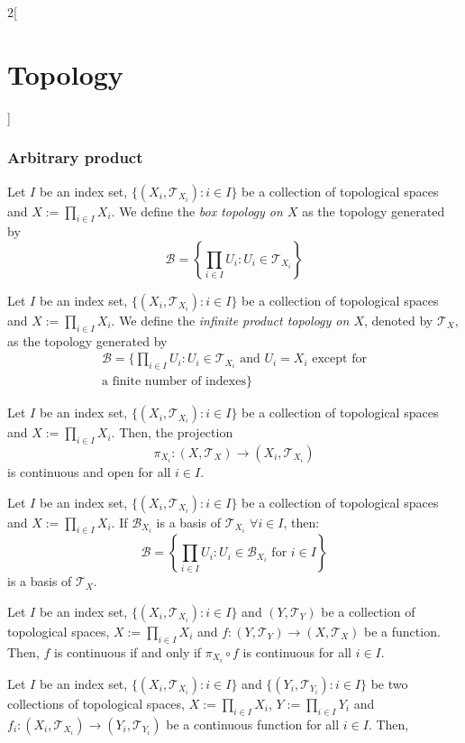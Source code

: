 \documentclass[../../../main.tex]{subfiles}
\begin{document}
\begin{multicols}{2}[\section{Topology}]
  \subsubsection{Arbitrary product}
  \begin{definition}
    Let $I$ be an index set, $\{(X_i,\mathcal{T}_{X_i}):i\in I\}$ be a collection of topological spaces and $X:=\prod_{i\in I}X_i$. We define the \textit{box topology on $X$} as the topology generated by $$\mathcal{B}=\left\{\prod_{i\in I}U_i:U_i\in\mathcal{T}_{X_i}\right\}$$
  \end{definition}
  \begin{definition}
    Let $I$ be an index set, $\{(X_i,\mathcal{T}_{X_i}):i\in I\}$ be a collection of topological spaces and $X:=\prod_{i\in I}X_i$. We define the \textit{infinite product topology on $X$}, denoted by $\mathcal{T}_X$, as the topology generated by
    \begin{multline*}
      \mathcal{B}=\Bigg\{\prod_{i\in I}U_i:U_i\in\mathcal{T}_{X_i}\text{ and $U_i=X_i$ except for}\\\text{a finite number of indexes}\Bigg\}
    \end{multline*}
  \end{definition}
  \begin{prop}
    Let $I$ be an index set, $\{(X_i,\mathcal{T}_{X_i}):i\in I\}$ be a collection of topological spaces and $X:=\prod_{i\in I}X_i$. Then, the projection $$\pi_{X_i}:\left(X,\mathcal{T}_X\right)\longrightarrow (X_i,\mathcal{T}_{X_i})$$
    is continuous and open for all $i\in I$.
  \end{prop}
  \begin{prop}
    Let $I$ be an index set, $\{(X_i,\mathcal{T}_{X_i}):i\in I\}$ be a collection of topological spaces and $X:=\prod_{i\in I}X_i$. If $\mathcal{B}_{X_i}$ is a basis of $\mathcal{T}_{X_i}$ $\forall i\in I$, then: $$\mathcal{B}=\left\{\prod_{i\in I}U_i:U_i\in\mathcal{B}_{X_i}\text{ for }i\in I\right\}$$
    is a basis of $\mathcal{T}_X$.
  \end{prop}
  \begin{prop}
    Let $I$ be an index set, $\{(X_i,\mathcal{T}_{X_i}):i\in I\}$ and $(Y,\mathcal{T}_Y)$ be a collection of topological spaces, $X:=\prod_{i\in I}X_i$ and $f:(Y,\mathcal{T}_Y)\rightarrow(X,\mathcal{T}_X)$ be a function. Then, $f$ is continuous if and only if $\pi_{X_i}\circ f$ is continuous for all $i\in I$.
  \end{prop}
  \begin{prop}
    Let $I$ be an index set, $\{(X_i,\mathcal{T}_{X_i}):i\in I\}$ and $\{(Y_i,\mathcal{T}_{Y_i}):i\in I\}$ be two collections of topological spaces, $X:=\prod_{i\in I}X_i$, $Y:=\prod_{i\in I}Y_i$ and $f_i:(X_i,\mathcal{T}_{X_i})\rightarrow(Y_i,\mathcal{T}_{Y_i})$ be a continuous function for all $i\in I$. Then,

\end{prop}
\end{multicols}
\end{document}
